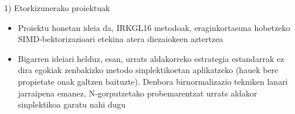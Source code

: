 \documentclass[
 10pt,%
 compress,%
 t,       %
 xcolor=svgnames
]{beamer}
\theoremstyle{definition} \newtheorem{definicion}{Definicion}[section]
\theoremstyle{propiedades} \newtheorem{propiedades}{Propiedades}[section]
\begin{document}
\begin{frame}[fragile]{1) Etorkizunerako proiektuak}
{\begin{itemize}
		\medskip
		\item Proiektu honetan ideia da, IRKGL16 metodoak, eraginkortasuna hobetzeko 
		SIMD-bektorizazioari etekina atera diezaiokeen aztertzea
		
		\medskip
	\item Bigarren ideiari helduz, esan, urrats aldakorreko estrategia estandarrak ez dira egokiak zenbakizko metodo sinplektikoetan aplikatzeko (hauek bere propietate onak galtzen baituzte). Denbora birnormalizazio tekniken lanari jarraipena emanez, N-gorputzetako probemarentzat urrats aldakor sinplektikoa garatu nahi dugu
		
		
		
		
		
	\end{itemize}
	
}





\end{frame}


\end{document}

